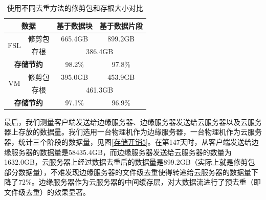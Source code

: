 \documentclass[promaster]{thesis-uestc}
\begin{document}
\begin{table}[htbp]
    \begin{center}
        \caption{使用不同去重方法的修剪包和存根大小对比}
        \label{使用不同去重方法的物理数据和存根大小对比}
        \begin{tabular}{|c|c|c|c|}
            \hline
            \multicolumn{2}{|c|}{\textbf{数据}}   & \textbf{基于数据块} & \textbf{基于数据片段}                         \\
            \hline\hline
            \multirow{2}{*}{FSL}                & 修剪包            & 665.4GB                       & 899.2GB \\

            \cline{2-4}
                                                & 存根             & \multicolumn{2}{|c|}{386.4GB}           \\
            \hline
            \multicolumn{2}{|c|}{\textbf{存储节约}} & 98.2\%         & 97.8\%                                  \\
            \hline\hline
            \multirow{2}{*}{VM}                 & 修剪包            & 395.0GB                       & 453.9GB \\
            \cline{2-4} %
                                                & 存根             & \multicolumn{2}{|c|}{461.3GB}           \\
            \hline
            \multicolumn{2}{|c|}{\textbf{存储节约}} & 97.1\%         & 96.9\%                                  \\
            \hline
        \end{tabular}
    \end{center}
\end{table}

最后，我们测量客户端发送给边缘服务器、边缘服务器发送给云服务器以及云服务器上存放的数据量。我们选用一台物理机作为边缘服务器，一台物理机作为云服务器，统计三个阶段的数据量，见图\ref{存储开销5}。在第147天时，从客户端发送给边缘服务器的数据量是58435.4GB，而边缘服务器发送给云服务器的数量为1632.0GB，云服务器上经过数据去重后的数据量是899.2GB（实际上就是修剪包部分数据量），不难发现边缘服务器的文件级去重使得转递给云服务器的数据量下降了72\%。边缘服务器作为云服务器的中间缓存层，对大数据流进行了预去重（即文件级去重）的效果显著。
\end{document}
